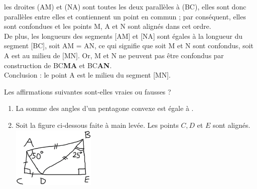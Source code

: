 \begin{corrige}
\begin{enumerate}
      les droites (AM) et (NA) sont toutes les deux parallèles à (BC), elles sont donc parallèles entre elles et contiennent un point en commun ; par conséquent, elles sont confondues et les points M, A et N sont alignés dans cet ordre. \\
      De plus, les longueurs des segments [AM] et [NA] sont égales à la longueur du segment [BC], soit AM = AN, ce qui signifie que soit M et N sont confondus, soit A est au milieu de [MN]. Or, M et N ne peuvent pas être confondus par construction de BC{\bf MA} et BC{\bf AN}. \\
      Conclusion : {\blue le point A est le milieu du segment [MN].}
   \end{enumerate}
\end{corrige}


\bigskip

\begin{exercice}[CRPE 2014 G1 et 2018 G1] %
   Les affirmations suivantes sont-elles vraies ou fausses ?
   \begin{enumerate}
      \item La somme des angles d'un pentagone convexe est égale à .
      \item Soit la figure ci-dessous faite à main levée. Les points $C, D$ et $E$ sont alignés.\\
         \includegraphics[width=4cm]{Geometrie/Images/G9_ex_angles}
   \end{enumerate}
\end{exercice}

